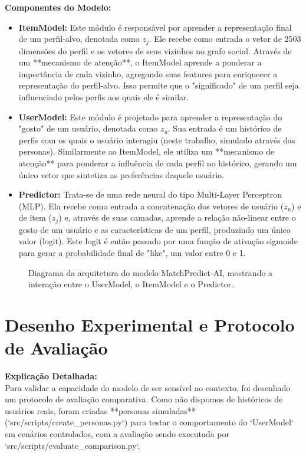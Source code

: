 \textbf{Componentes do Modelo:}
\begin{itemize}
    \item \textbf{ItemModel:} Este módulo é responsável por aprender a representação final de um perfil-alvo, denotada como $z_j$. Ele recebe como entrada o vetor de 2503 dimensões do perfil e os vetores de seus vizinhos no grafo social. Através de um **mecanismo de atenção**, o ItemModel aprende a ponderar a importância de cada vizinho, agregando suas features para enriquecer a representação do perfil-alvo. Isso permite que o "significado" de um perfil seja influenciado pelos perfis aos quais ele é similar.
    \item \textbf{UserModel:} Este módulo é projetado para aprender a representação do "gosto" de um usuário, denotada como $z_u$. Sua entrada é um histórico de perfis com os quais o usuário interagiu (neste trabalho, simulado através das personas). Similarmente ao ItemModel, ele utiliza um **mecanismo de atenção** para ponderar a influência de cada perfil no histórico, gerando um único vetor que sintetiza as preferências daquele usuário.
    \item \textbf{Predictor:} Trata-se de uma rede neural do tipo Multi-Layer Perceptron (MLP). Ela recebe como entrada a concatenação dos vetores de usuário ($z_u$) e de item ($z_j$) e, através de suas camadas, aprende a relação não-linear entre o gosto de um usuário e as características de um perfil, produzindo um único valor (logit). Este logit é então passado por uma função de ativação sigmoide para gerar a probabilidade final de "like", um valor entre 0 e 1.
\end{itemize}

\begin{figure}[hbt]
    \centering
    \caption{Diagrama da arquitetura do modelo MatchPredict-AI, mostrando a interação entre o UserModel, o ItemModel e o Predictor.}
    \label{fig:arquitetura_modelo}
\end{figure}

\section{Desenho Experimental e Protocolo de Avaliação}
\label{sec:desenho_experimental}

\textbf{Explicação Detalhada:} \\
Para validar a capacidade do modelo de ser sensível ao contexto, foi desenhado um protocolo de avaliação comparativa. Como não dispomos de históricos de usuários reais, foram criadas **personas simuladas** (`src/scripts/create_personas.py`) para testar o comportamento do `UserModel` em cenários controlados, com a avaliação sendo executada por `src/scripts/evaluate_comparison.py`.

